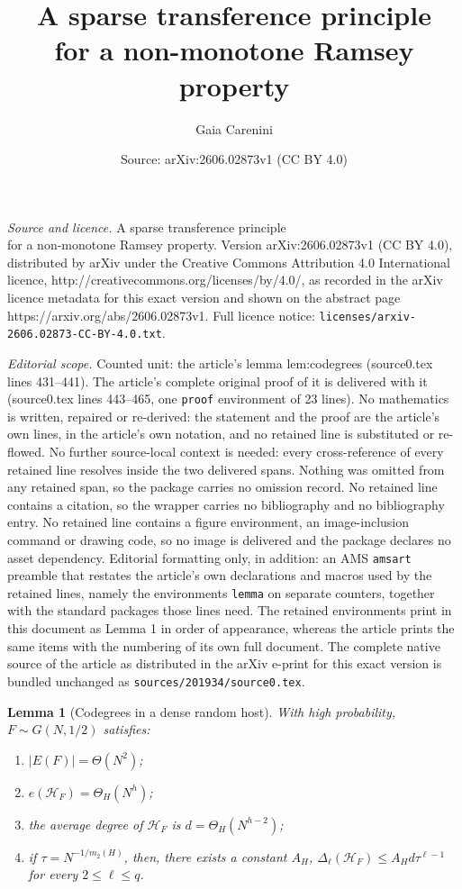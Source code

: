 \documentclass[10pt,a4paper]{amsart}
\title{A sparse transference principle \\for a non-monotone Ramsey property}
\author{Gaia Carenini}
\date{Source: arXiv:2606.02873v1 (CC BY 4.0)}
\newtheorem{lemma}{Lemma}
\newcommand{\calH}{\mathcal H}
\begin{document}
\maketitle

\noindent\emph{Source and licence.} A sparse transference principle \\for a non-monotone Ramsey property. Version arXiv:2606.02873v1 (CC BY 4.0), distributed by arXiv under the Creative Commons Attribution 4.0 International licence, http://creativecommons.org/licenses/by/4.0/, as recorded in the arXiv licence metadata for this exact version and shown on the abstract page https://arxiv.org/abs/2606.02873v1. Full licence notice: \texttt{licenses/arxiv-2606.02873-CC-BY-4.0.txt}.\par\smallskip

\noindent\textit{Editorial scope.} Counted unit: the article's lemma lem:codegrees (source0.tex lines 431--441). The article's complete original proof of it is delivered with it (source0.tex lines 443--465, one \texttt{proof} environment of 23 lines). No mathematics is written, repaired or re-derived: the statement and the proof are the article's own lines, in the article's own notation, and no retained line is substituted or re-flowed.  No further source-local context is needed: every cross-reference of every retained line resolves inside the two delivered spans.  Nothing was omitted from any retained span, so the package carries no omission record.  No retained line contains a citation, so the wrapper carries no bibliography and no bibliography entry.  No retained line contains a figure environment, an image-inclusion command or drawing code, so no image is delivered and the package declares no asset dependency.  Editorial formatting only, in addition: an AMS \texttt{amsart} preamble that restates the article's own declarations and macros used by the retained lines, namely the environments \texttt{lemma} on separate counters, together with the standard packages those lines need.  The retained environments print in this document as Lemma 1 in order of appearance, whereas the article prints the same items with the numbering of its own full document.  The complete native source of the article as distributed in the arXiv e-print for this exact version is bundled unchanged as \texttt{sources/201934/source0.tex}.
\begin{lemma}[Codegrees in a dense random host]
\label{lem:codegrees}
With high probability, $F\sim G(N,1/2)$ satisfies:
\begin{enumerate}[label=\textup{(\arabic*)}]
\item $|E(F)|=\Theta(N^2)$;
\item $e(\calH_F)=\Theta_H(N^h)$;
\item the average degree of $\calH_F$ is $d=\Theta_H(N^{h-2})$;
\item if $\tau=N^{-1/m_2(H)}$, then, there exists a constant $A_H$,
$ \Delta_\ell(\calH_F)\le A_H d\tau^{\ell-1}$ for every $2\le \ell\le q$.
\end{enumerate}
\end{lemma}
\end{document}
